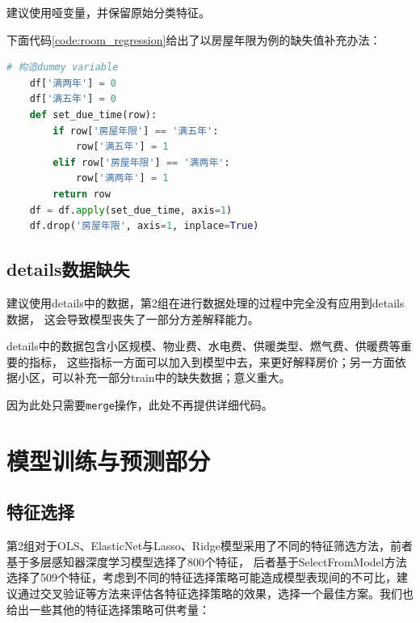 \documentclass[
    report,     %
    oneside,    %
    UTF8,       %
    zihao=-4    %
]{config} %
\begin{document}
建议使用哑变量，并保留原始分类特征。

下面代码\ref{code:room_regression}给出了以房屋年限为例的缺失值补充办法：

\begin{lstlisting}[label=code:room_regression, language=Python, caption=房屋年限处理改进建议]
    # 构造dummy variable
    df['满两年'] = 0
    df['满五年'] = 0
    def set_due_time(row):
        if row['房屋年限'] == '满五年':
            row['满五年'] = 1
        elif row['房屋年限'] == '满两年':
            row['满两年'] = 1
        return row
    df = df.apply(set_due_time, axis=1)
    df.drop('房屋年限', axis=1, inplace=True)
\end{lstlisting}

\subsection{details数据缺失}

建议使用details中的数据，第2组在进行数据处理的过程中完全没有应用到details数据，
这会导致模型丧失了一部分方差解释能力。

details中的数据包含小区规模、物业费、水电费、供暖类型、燃气费、供暖费等重要的指标，
这些指标一方面可以加入到模型中去，来更好解释房价；另一方面依据小区，可以补充一部分train中的缺失数据；意义重大。

因为此处只需要\lstinline|merge|操作，此处不再提供详细代码。

\section{模型训练与预测部分}

\subsection{特征选择}

第2组对于OLS、ElasticNet与Lasso、Ridge模型采用了不同的特征筛选方法，前者基于多层感知器深度学习模型选择了800个特征，
后者基于SelectFromModel方法选择了509个特征，考虑到不同的特征选择策略可能造成模型表现间的不可比，建议通过交叉验证等方法来评估各特征选择策略的效果，选择一个最佳方案。我们也给出一些其他的特征选择策略可供考量：
\end{document}
